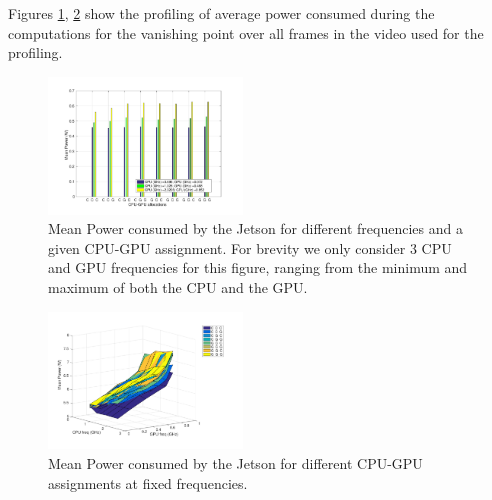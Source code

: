 Figures \ref{fig:dfsa_pow}, \ref{fig:sfda_pow} show the profiling of average power consumed during the computations for the vanishing point over all frames in the video used for the profiling.


\begin{figure}[htbp]
\centering
\includegraphics[width=0.46\textwidth]{Data/figs/PowerHist.pdf}
\caption{Mean Power consumed by the Jetson for different frequencies and a given CPU-GPU assignment.  For brevity we only consider 3 CPU and GPU frequencies for this figure, ranging from the minimum and maximum of both the CPU and the GPU.}
\label{fig:dfsa_pow} %
\end{figure}

\begin{figure}[htbp]
	\centering
	\includegraphics[width=0.46\textwidth]{Data/figs/surf_Power.pdf}
	\caption{Mean Power consumed by the Jetson for different CPU-GPU assignments at fixed frequencies.}
	\label{fig:sfda_pow}%
\end{figure}



